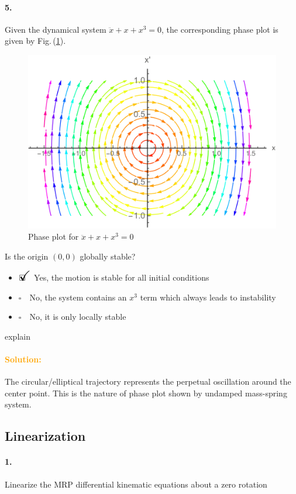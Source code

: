 \documentclass[12pt, a4paper]{article}
\newcommand{\ans}{\item[]$\rlap{\LARGE{\checkmark}}\square\quad$}
\newcommand{\noans}{\item[]$\square\quad$}
\begin{document}
\paragraph{5.}
Given the dynamical system $\ddot{x}+x+x^{3}=0$, the corresponding phase plot is given by Fig.\,(\ref{fig_global_stability_phase_plot_3}).

\begin{figure}[ht]
\centering
\includegraphics[scale=0.3]{figs/fig_global_stability_phase_plot_3.png}
\caption{Phase plot for $\ddot{x}+x+x^{3}=0$}
\label{fig_global_stability_phase_plot_3}
\end{figure}

Is the origin $(0,0)$ globally stable?
\begin{itemize}
\ans Yes, the motion is stable for all initial conditions
\noans No, the system contains an $x^3$ term which always leads to instability
\noans No, it is only locally stable
\end{itemize}
explain

\paragraph{\textcolor{orange}{Solution:}}
The circular/elliptical trajectory represents the perpetual oscillation around the center point. This is the nature of phase plot shown by undamped mass-spring system.

\newpage
\subsection{Linearization}
\paragraph{1.}
Linearize the MRP differential kinematic equations about a zero rotation
\end{document}
